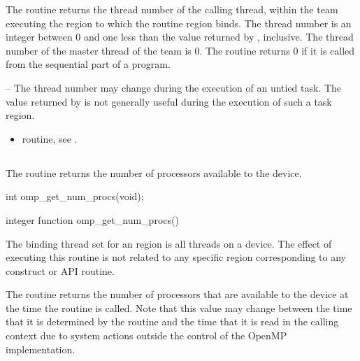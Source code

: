 \effect
The  routine returns the thread number of the calling thread, 
within the team executing the  region to which the routine region binds. The 
thread number is an integer between 0 and one less than the value returned by 
, inclusive. The thread number of the master thread of the 
team is 0. The routine returns 0 if it is called from the sequential part of a program.

\notestart
\noteheader – The thread number may change during the execution of an untied task. The 
value returned by  is not generally useful during the execution 
of such a task region.
\noteend

\crossreferences
\begin{itemize}
\item {} routine, see 
.
\end{itemize}








\subsection{}
\label{subsec:omp_get_num_procs}
\summary
The  routine returns the number of processors available to the 
device.

\format
\ccppspecificstart
\begin{boxedcode}
int omp\_get\_num\_procs(void);
\end{boxedcode}
\ccppspecificend

\fortranspecificstart
\begin{boxedcode}
integer function omp\_get\_num\_procs()
\end{boxedcode}
\fortranspecificend

\binding
The binding thread set for an  region is all threads on a device. 
The effect of executing this routine is not related to any specific region corresponding to 
any construct or API routine.

\effect
The  routine returns the number of processors that are available 
to the device at the time the routine is called. Note that this value may change between 
the time that it is determined by the  routine and the time that it 
is read in the calling context due to system actions outside the control of the OpenMP 
implementation.









